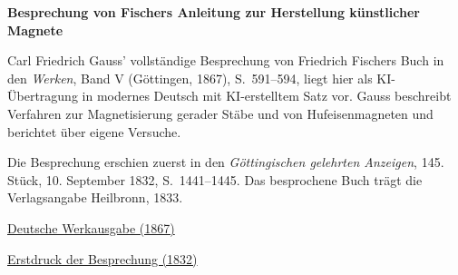 \clearpage
\thispagestyle{empty}
\begin{center}\Large\textbf{Besprechung von Fischers Anleitung zur Herstellung künstlicher Magnete}\end{center}

Carl Friedrich Gauss’ vollständige Besprechung von Friedrich Fischers Buch in den \textit{Werken}, Band V (Göttingen, 1867), S.~591--594, liegt hier als KI-Übertragung in modernes Deutsch mit KI-erstelltem Satz vor. Gauss beschreibt Verfahren zur Magnetisierung gerader Stäbe und von Hufeisenmagneten und berichtet über eigene Versuche.

Die Besprechung erschien zuerst in den \textit{Göttingischen gelehrten Anzeigen}, 145. Stück, 10. September 1832, S.~1441--1445. Das besprochene Buch trägt die Verlagsangabe Heilbronn, 1833.

\medskip\noindent
\href{https://gdz.sub.uni-goettingen.de/id/PPN236006339}{Deutsche Werkausgabe (1867)}\par
\noindent\href{https://gdz.sub.uni-goettingen.de/id/PPN385030444_1832_2}{Erstdruck der Besprechung (1832)}
\clearpage
